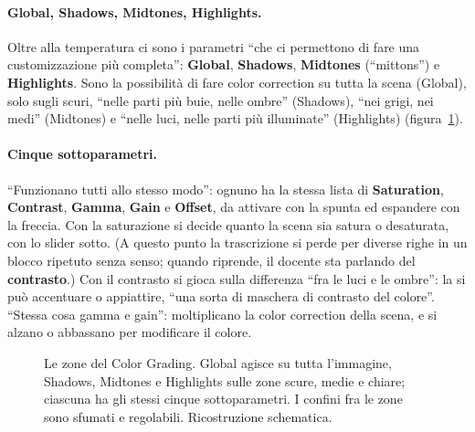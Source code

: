 \paragraph{Global, Shadows, Midtones, Highlights.} Oltre alla temperatura ci sono i parametri
``che ci permettono di fare una customizzazione più completa'': \textbf{Global},
\textbf{Shadows}, \textbf{Midtones} (``mittons'') e \textbf{Highlights}. Sono la possibilità
di fare color correction su tutta la scena (Global), solo sugli scuri, ``nelle parti più buie,
nelle ombre'' (Shadows), ``nei grigi, nei medi'' (Midtones) e ``nelle luci, nelle parti più
illuminate'' (Highlights) (figura~\ref{ue16:fig:grading}).

\paragraph{Cinque sottoparametri.} ``Funzionano tutti allo stesso modo'': ognuno ha la stessa
lista di \textbf{Saturation}, \textbf{Contrast}, \textbf{Gamma}, \textbf{Gain} e
\textbf{Offset}, da attivare con la spunta ed espandere con la freccia. Con la saturazione si
decide quanto la scena sia satura o desaturata, con lo slider sotto. (A questo punto la
trascrizione si perde per diverse righe in un blocco ripetuto senza senso; quando riprende, il
docente sta parlando del \textbf{contrasto}.) Con il contrasto si gioca sulla differenza ``fra
le luci e le ombre'': la si può accentuare o appiattire, ``una sorta di maschera di contrasto
del colore''. ``Stessa cosa gamma e gain'': moltiplicano la color correction della scena, e si
alzano o abbassano per modificare il colore.

\begin{figure}[htbp]
\centering
{}
\caption{Le zone del Color Grading. Global agisce su tutta l'immagine, Shadows, Midtones e
Highlights sulle zone scure, medie e chiare; ciascuna ha gli stessi cinque sottoparametri.
I confini fra le zone sono sfumati e regolabili. Ricostruzione schematica.}
\label{ue16:fig:grading}
\end{figure}

